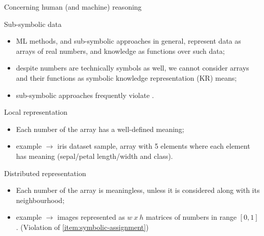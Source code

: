 \documentclass[presentation]{beamer}\mode<presentation>{\usetheme{AMSBolognaFC}}
\begin{document}
\begin{frame}[allowframebreaks]{Concerning human (and machine) reasoning}
    
    \framebreak

    \begin{block}{Sub-symbolic data}
    \begin{itemize}
        \item ML methods, and sub-symbolic approaches in general, represent data as arrays of real numbers, and knowledge as functions over such data;
        \item despite numbers are technically symbols as well, we cannot consider arrays and their functions as symbolic knowledge representation (KR) means;
        \item sub-symbolic approaches frequently violate .
    \end{itemize}
    \end{block}
    
    \framebreak
    
    \begin{block}{Local representation}
        \begin{itemize}
            \item Each number of the array has a well-defined meaning;
            \item example $\rightarrow$ iris dataset sample, array with 5 elements where each element has meaning (sepal/petal length/width and class).
        \end{itemize}    
    \end{block}

    \begin{block}{Distributed representation}
        \begin{itemize}
            \item Each number of the array is meaningless, unless it is considered along with its neighbourhood;
            \item example $\rightarrow$ images represented as $w\ x\ h$ matrices of numbers in range $[0,1]$.
            (Violation of \cref{item:symbolic-assignment})
        \end{itemize}
    \end{block}
    
    
\end{frame}



\section{\longski}
\end{document}
